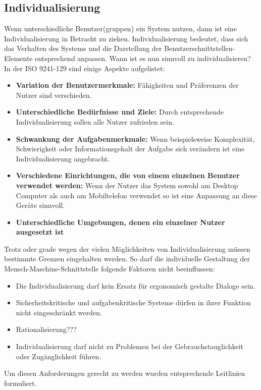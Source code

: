 \subsection{Individualisierung}
Wenn unterschiedliche Benutzer(gruppen) ein System nutzen, dann ist eine Individualisierung in Betracht zu ziehen. Individualisierung bedeutet, dass sich das Verhalten des Systems und die Darstellung der Benutzerschnittstellen-Elemente entsprechend anpassen. Wann ist es nun sinnvoll zu individualisieren? In der ISO 9241-129 sind einige Aspekte aufgelistet:
\begin{itemize}
\item \textbf{Variation der Benutzermerkmale:} Fähigkeiten und Präferenzen der Nutzer sind verschieden.
\item \textbf{Unterschiedliche Bedürfnisse und Ziele:} Durch entsprechende Individualisierung sollen alle Nutzer zufrieden sein.
\item \textbf{Schwankung der Aufgabenmerkmale:} Wenn beispielsweise Komplexität, Schwierigkeit oder Informationsgehalt der Aufgabe sich verändern ist eine Individualisierung angebracht.
\item \textbf{Verschiedene Einrichtungen, die von einem einzelnen Benutzer verwendet werden:} Wenn der Nutzer das System sowohl am Desktop Computer als auch am Mobiltelefon verwendet so ist eine Anpassung an diese Geräte sinnvoll.
\item \textbf{Unterschiedliche Umgebungen, denen ein einzelner Nutzer ausgesetzt ist}
\end{itemize}
Trotz oder grade wegen der vielen Möglichkeiten von Individualisierung müssen bestimmte Grenzen eingehalten werden. So darf die individuelle Gestaltung der Mensch-Maschine-Schnittstelle folgende Faktoren nicht beeinflussen:
\begin{itemize}
\item Die Individualisierung darf kein Ersatz für ergonomisch gestalte Dialoge sein.
\item Sicherheitskritische und aufgabenkritische Systeme dürfen in ihrer Funktion nicht eingeschränkt werden.
\item Rationalisierung???
\item Individualisierung darf nicht zu Problemen bei der Gebrauchstauglichkeit oder Zugänglichkeit führen.
\end{itemize}
Um diesen Anforderungen gerecht zu werden wurden entsprechende Leitlinien formuliert.
